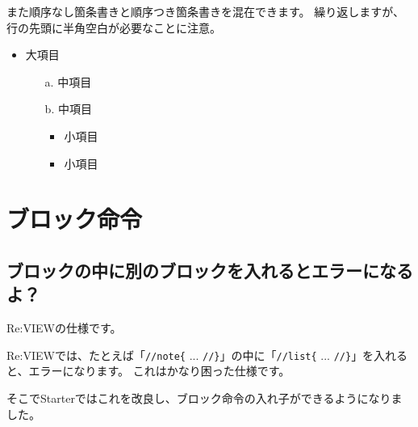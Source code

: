 \endstarterresult

また順序なし箇条書きと順序つき箇条書きを混在できます。
繰り返しますが、行の先頭に半角空白が必要なことに注意。

\begin{starterprogram}\end{starterprogram}
\noindent
{}

\starterresult

\begin{itemize}
\item 大項目

\begin{enumerate}
\item[a.] 中項目
\item[b.] 中項目

\begin{itemize}
\item 小項目
\item 小項目
\end{itemize}

\end{enumerate}

\end{itemize}

\endstarterresult

\section{ブロック命令}
\label{sec:2-3}
\label{sec-faq-block}

\subsection{ブロックの中に別のブロックを入れるとエラーになるよ？}
\label{sec:2-3-1}
\label{subsec-faq-block1}

Re:VIEWの仕様です。

Re:VIEWでは、たとえば「\texttt{//note\{} ... \texttt{//\}}」の中に「\texttt{//list\{} ... \texttt{//\}}」を入れると、エラーになります。
これはかなり困った仕様です。

そこでStarterではこれを改良し、ブロック命令の入れ子ができるようになりました。

\begin{starterprogram}\end{starterprogram}
\noindent
{}


